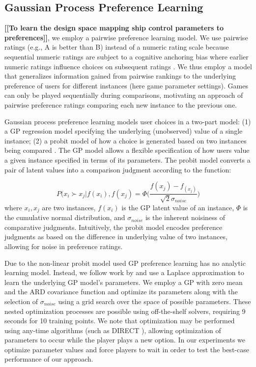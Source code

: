 \documentclass[letterpaper]{article}
\newcommand{\mytodo}[1]{\textbf{[[#1]]}}
\begin{document}
\subsection{Gaussian Process Preference Learning}

\mytodo{To learn the design space mapping ship control parameters to preferences}, we employ a pairwise preference learning model.
We use pairwise ratings (e.g., A is better than B) instead of a numeric rating scale because
sequential numeric ratings are subject to a cognitive anchoring bias where earlier numeric ratings influence choices on subsequent ratings \cite{tversky1974:biases}. We thus employ a model that generalizes information gained from pairwise rankings to the underlying preference of users for different instances (here game parameter settings). Games can only be played sequentially during comparisons, motivating an approach of pairwise preference ratings comparing each new instance to the previous one.

Gaussian process preference learning models user choices in a two-part model: (1) a GP regression model specifying the underlying  (unobserved) value of a single instance; (2) a probit model of how a choice is generated based on two instances being compared \cite{chu2005}. The GP model allows a flexible specification of how users value a given instance specified in terms of its parameters. The probit model
converts a pair of latent values into a comparison judgment according to the function:

$$ P( x_i \succ x_j | f(x_i), f(x_j) = \Phi\bigg( \frac{f(x_j) - f_(x_j)}{\sqrt{2} \sigma_{noise}} \bigg) $$
where $x_i, x_j$ are two instances, $f(x_i)$ is the GP latent value of an instance, $\Phi$ is the cumulative normal distribution, and $\sigma_{noise}$ is the inherent noisiness of comparative judgments. Intuitively, the probit model encodes preference judgments as based on the difference in underlying value of two instances, allowing for noise in preference ratings. 

Due to the non-linear probit model used GP preference learning has no analytic learning model. Instead, we follow work by \cite{chu2005} and use a Laplace approximation to learn the underlying GP model's parameters. We employ a GP with zero mean and the ARD covariance function and optimize its parameters along with the selection of $\sigma_{noise}$ using a grid search over the space of possible parameters. These nested optimization processes are possible using off-the-shelf solvers, requiring 9 seconds for 10 training points. 
We note that optimization may be performed using any-time algorithms (such as DIRECT \cite{jones1993:direct}), allowing optimization of parameters to occur while the player plays a new option. In our experiments we optimize parameter values and force players to wait in order to test the best-case performance of our approach.
\end{document}
